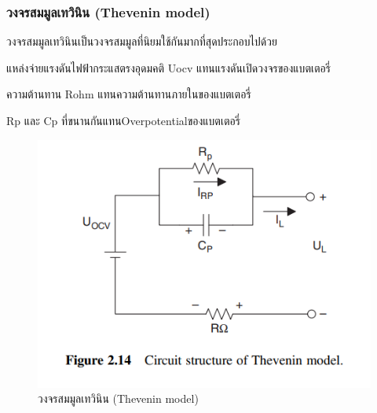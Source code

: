 \subsubsection*{วงจรสมมูลเทวินิน (Thevenin model)}
วงจรสมมูลเทวินินเป็นวงจรสมมูลที่นิยมใช้กันมากที่สุดประกอบไปด้วย
\begin{itemize}
{\item 	แหล่งจ่ายแรงดันไฟฟ้ากระแสตรงอุดมคติ Uocv แทนแรงดันเปิดวงจรของแบตเตอรี่}
{\item 	ความต้านทาน Rohm แทนความต้านทานภายในของแบตเตอรี่}
{\item 	Rp และ Cp ที่ขนานกันแทนOverpotentialของแบตเตอรี่}
\end{itemize}
\begin{center}
	\begin{figure}[!h]
		\includegraphics[width=0.6\linewidth]{Chapters/img/Thevenin_model.png}
			\centering
			\captionsetup{justification=centering,margin=2cm}
			\caption{วงจรสมมูลเทวินิน (Thevenin model)}
	\end{figure}
\end{center}
